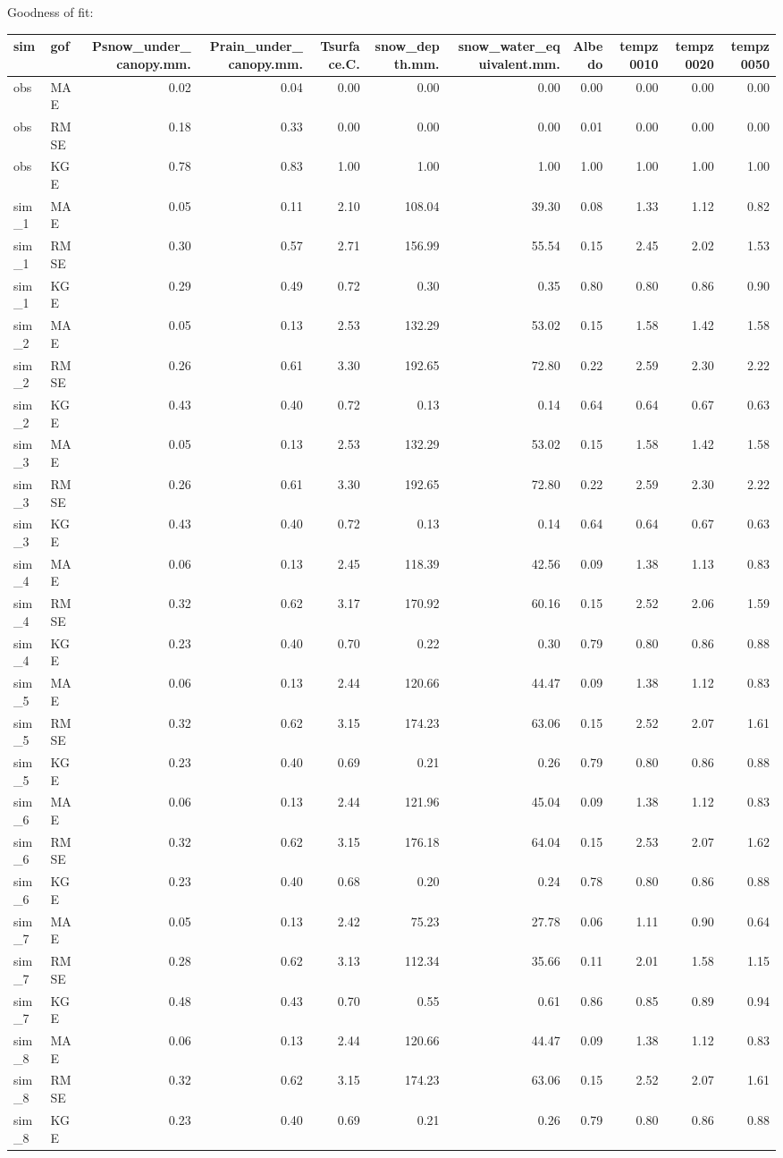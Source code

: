 \documentclass[
]{article}
\begin{document}
Goodness of fit:

\begin{longtable}[]{@{}llrrrrrrrrr@{}}
\toprule
sim & gof & Psnow\_under\_canopy.mm. & Prain\_under\_canopy.mm. &
Tsurface.C. & snow\_depth.mm. & snow\_water\_equivalent.mm. & Albedo &
tempz0010 & tempz0020 & tempz0050\tabularnewline
\midrule
\endhead
obs & MAE & 0.02 & 0.04 & 0.00 & 0.00 & 0.00 & 0.00 & 0.00 & 0.00 &
0.00\tabularnewline
obs & RMSE & 0.18 & 0.33 & 0.00 & 0.00 & 0.00 & 0.01 & 0.00 & 0.00 &
0.00\tabularnewline
obs & KGE & 0.78 & 0.83 & 1.00 & 1.00 & 1.00 & 1.00 & 1.00 & 1.00 &
1.00\tabularnewline
sim\_1 & MAE & 0.05 & 0.11 & 2.10 & 108.04 & 39.30 & 0.08 & 1.33 & 1.12
& 0.82\tabularnewline
sim\_1 & RMSE & 0.30 & 0.57 & 2.71 & 156.99 & 55.54 & 0.15 & 2.45 & 2.02
& 1.53\tabularnewline
sim\_1 & KGE & 0.29 & 0.49 & 0.72 & 0.30 & 0.35 & 0.80 & 0.80 & 0.86 &
0.90\tabularnewline
sim\_2 & MAE & 0.05 & 0.13 & 2.53 & 132.29 & 53.02 & 0.15 & 1.58 & 1.42
& 1.58\tabularnewline
sim\_2 & RMSE & 0.26 & 0.61 & 3.30 & 192.65 & 72.80 & 0.22 & 2.59 & 2.30
& 2.22\tabularnewline
sim\_2 & KGE & 0.43 & 0.40 & 0.72 & 0.13 & 0.14 & 0.64 & 0.64 & 0.67 &
0.63\tabularnewline
sim\_3 & MAE & 0.05 & 0.13 & 2.53 & 132.29 & 53.02 & 0.15 & 1.58 & 1.42
& 1.58\tabularnewline
sim\_3 & RMSE & 0.26 & 0.61 & 3.30 & 192.65 & 72.80 & 0.22 & 2.59 & 2.30
& 2.22\tabularnewline
sim\_3 & KGE & 0.43 & 0.40 & 0.72 & 0.13 & 0.14 & 0.64 & 0.64 & 0.67 &
0.63\tabularnewline
sim\_4 & MAE & 0.06 & 0.13 & 2.45 & 118.39 & 42.56 & 0.09 & 1.38 & 1.13
& 0.83\tabularnewline
sim\_4 & RMSE & 0.32 & 0.62 & 3.17 & 170.92 & 60.16 & 0.15 & 2.52 & 2.06
& 1.59\tabularnewline
sim\_4 & KGE & 0.23 & 0.40 & 0.70 & 0.22 & 0.30 & 0.79 & 0.80 & 0.86 &
0.88\tabularnewline
sim\_5 & MAE & 0.06 & 0.13 & 2.44 & 120.66 & 44.47 & 0.09 & 1.38 & 1.12
& 0.83\tabularnewline
sim\_5 & RMSE & 0.32 & 0.62 & 3.15 & 174.23 & 63.06 & 0.15 & 2.52 & 2.07
& 1.61\tabularnewline
sim\_5 & KGE & 0.23 & 0.40 & 0.69 & 0.21 & 0.26 & 0.79 & 0.80 & 0.86 &
0.88\tabularnewline
sim\_6 & MAE & 0.06 & 0.13 & 2.44 & 121.96 & 45.04 & 0.09 & 1.38 & 1.12
& 0.83\tabularnewline
sim\_6 & RMSE & 0.32 & 0.62 & 3.15 & 176.18 & 64.04 & 0.15 & 2.53 & 2.07
& 1.62\tabularnewline
sim\_6 & KGE & 0.23 & 0.40 & 0.68 & 0.20 & 0.24 & 0.78 & 0.80 & 0.86 &
0.88\tabularnewline
sim\_7 & MAE & 0.05 & 0.13 & 2.42 & 75.23 & 27.78 & 0.06 & 1.11 & 0.90 &
0.64\tabularnewline
sim\_7 & RMSE & 0.28 & 0.62 & 3.13 & 112.34 & 35.66 & 0.11 & 2.01 & 1.58
& 1.15\tabularnewline
sim\_7 & KGE & 0.48 & 0.43 & 0.70 & 0.55 & 0.61 & 0.86 & 0.85 & 0.89 &
0.94\tabularnewline
sim\_8 & MAE & 0.06 & 0.13 & 2.44 & 120.66 & 44.47 & 0.09 & 1.38 & 1.12
& 0.83\tabularnewline
sim\_8 & RMSE & 0.32 & 0.62 & 3.15 & 174.23 & 63.06 & 0.15 & 2.52 & 2.07
& 1.61\tabularnewline
sim\_8 & KGE & 0.23 & 0.40 & 0.69 & 0.21 & 0.26 & 0.79 & 0.80 & 0.86 &
0.88\tabularnewline
\bottomrule
\end{longtable}
\end{document}
